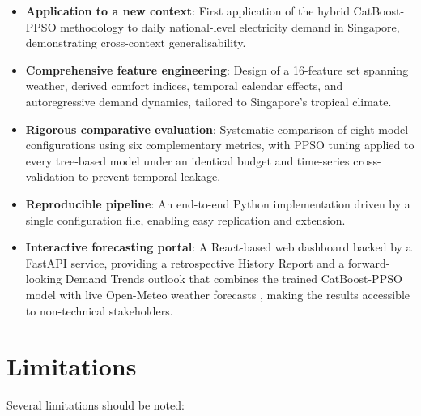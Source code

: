 \begin{itemize}
    \item \textbf{Application to a new context}: First application of the hybrid CatBoost-PPSO methodology to daily national-level electricity demand in Singapore, demonstrating cross-context generalisability.
    
    \item \textbf{Comprehensive feature engineering}: Design of a 16-feature set spanning weather, derived comfort indices, temporal calendar effects, and autoregressive demand dynamics, tailored to Singapore's tropical climate.
    
    \item \textbf{Rigorous comparative evaluation}: Systematic comparison of eight model configurations using six complementary metrics, with PPSO tuning applied to every tree-based model under an identical budget and time-series cross-validation to prevent temporal leakage.
    
    \item \textbf{Reproducible pipeline}: An end-to-end Python implementation driven by a single configuration file, enabling easy replication and extension.
    
    \item \textbf{Interactive forecasting portal}: A React-based web dashboard backed by a FastAPI service, providing a retrospective History Report and a forward-looking Demand Trends outlook that combines the trained CatBoost-PPSO model with live Open-Meteo weather forecasts \parencite{openmeteo2025api}, making the results accessible to non-technical stakeholders.
\end{itemize}


\section{Limitations}

Several limitations should be noted:

